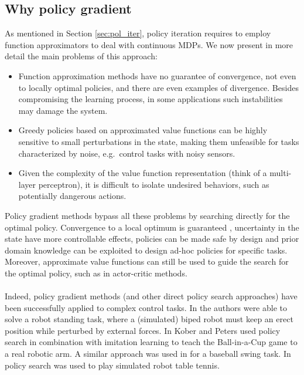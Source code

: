 \subsection{Why policy gradient}\label{sec:why_pg}
As mentioned in Section \ref{sec:pol_iter}, policy iteration requires to employ function approximators to deal with continuous \ac{MDP}s. We now present in more detail the main problems of this approach:
\begin{itemize}
\item Function approximation methods have no guarantee of convergence, not even to locally optimal policies, and there are even examples of divergence. Besides compromising the learning process, in some applications such instabilities may damage the system. 
\item Greedy policies based on approximated value functions can be highly sensitive to small perturbations in the state, making them unfeasible for tasks characterized by noise, e.g.\ control tasks with noisy sensors.
\item Given the complexity of the value function representation (think of a multi-layer perceptron), it is difficult to isolate undesired behaviors, such as potentially dangerous actions.
\end{itemize}
Policy gradient methods bypass all these problems by searching directly for the optimal policy. Convergence to a local optimum is guaranteed \cite{More:1994:LSA:192115.192132}, uncertainty in the state have more controllable effects, policies can be made safe by design and prior domain knowledge can be exploited to design ad-hoc policies for specific tasks. Moreover, approximate value functions can still be used to guide the search for the optimal policy, such as in actor-critic methods.

\paragraph{} %
Indeed, policy gradient methods (and other direct policy search approaches) have been successfully applied to complex control tasks. In \cite{Sehnke2008policy} the authors were able to solve a robot standing task, where a (simulated) biped robot must keep an erect position while perturbed by external forces. In \cite{kober_NIPS2008} Kober and Peters used policy search in combination with imitation learning to teach the Ball-in-a-Cup game to a real robotic arm. A similar approach was used in \cite{Peters2008natural} for a baseball swing task. In \cite{peters2010relative} policy search was used to play simulated robot table tennis. 


